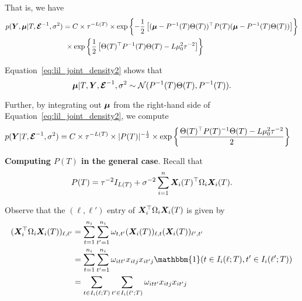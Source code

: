 \documentclass[11pt]{article}
\begin{document}
That is, we have
\begin{align}
\begin{split}
\label{eq:lil_joint_density2}
p(\bm{Y}, \boldsymbol{\mu} \vert T, \boldsymbol{\mathcal{E}}^{-1}, \sigma^{2}) &= C \times \tau^{-L(T)} \times \exp\left\{-\frac{1}{2}\left[(\boldsymbol{\mu} - P^{-1}(T)\Theta(T))^{\top}P(T)(\boldsymbol{\mu} - P^{-1}(T)\Theta(T))\right]\right\} \\
~&~\times \exp\left\{\frac{1}{2}\left[\Theta(T)^{\top}P^{-1}(T)\Theta(T) - L\mu_{0}^{2}\tau^{-2}\right]\right\}
\end{split}
\end{align}

Equation~\eqref{eq:lil_joint_density2} shows that
$$
\boldsymbol{\mu} \vert T, \bm{Y}, \boldsymbol{\mathcal{E}}^{-1}, \sigma^{2} \sim \mathcal{N}(P^{-1}(T)\Theta(T), P^{-1}(T)).
$$

Further, by integrating out $\boldsymbol{\mu}$ from the right-hand side of Equation~\eqref{eq:lil_joint_density2}, we compute
\begin{align*}
p(\bm{Y} \vert T, \boldsymbol{\mathcal{E}}^{-1}, \sigma^{2}) &= C \times \tau^{-L(T)} \times \lvert P(T) \rvert^{-\frac{1}{2}} \times \exp\left\{\frac{\Theta(T)^{\top}P(T)^{-1}\Theta(T) - L\mu_{0}^{2}\tau^{-2}}{2}\right\}
\end{align*}

\textbf{Computing $P(T)$ in the general case}. Recall that
$$
P(T) = \tau^{-2}I_{L(T)} + \sigma^{-2}\sum_{i = 1}^{n}{\bm{X}_{i}(T)^{\top}\Omega_{i}\bm{X}_{i}(T)}.
$$

Observe that the $(\ell, \ell')$ entry of $\bm{X}_{i}^{\top}\Omega_{i}\bm{X}_{i}(T)$ is given by
\begin{align*}
(\bX_{i}^{\top}\Omega_{i}\bX_{i}(T))_{\ell,\ell'} &= \sum_{t = 1}^{n_{i}}{\sum_{t' = 1}^{n_{i}}{\omega_{t,t'}(\bX_{i}(T))_{\ell,t}(\bX_{i}(T))_{\ell',t'}}} \\
&= \sum_{t = 1}^{n_{i}}{\sum_{t' = 1}^{n_{i}}{\omega_{itt'}x_{itj}x_{it'j}\mathbbm{1}(t \in I_{i}(\ell;T), t' \in I_{i}(\ell';T))}} \\
&= \sum_{t \in I_{i}(\ell;T)}{\sum_{t' \in I_{i}(\ell';T)}{\omega_{itt'}x_{itj}x_{it'j}}}
\end{align*}




\end{document}
